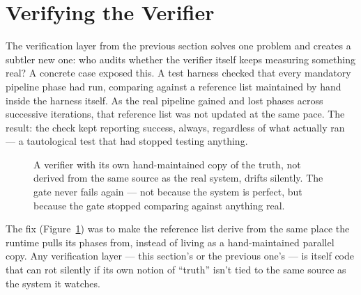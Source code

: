 \documentclass[10pt]{article}
\begin{document}
\section{Verifying the Verifier}

The verification layer from the previous section solves one problem and creates a subtler new one: who audits whether the verifier itself keeps measuring something real? A concrete case exposed this. A test harness checked that every mandatory pipeline phase had run, comparing against a reference list maintained by hand inside the harness itself. As the real pipeline gained and lost phases across successive iterations, that reference list was not updated at the same pace. The result: the check kept reporting success, always, regardless of what actually ran --- a tautological test that had stopped testing anything.

\begin{figure}[h]
\centering
{}
\caption{A verifier with its own hand-maintained copy of the truth, not derived from the same source as the real system, drifts silently. The gate never fails again --- not because the system is perfect, but because the gate stopped comparing against anything real.}
\label{fig:metaverify}
\end{figure}

The fix (Figure~\ref{fig:metaverify}) was to make the reference list derive from the same place the runtime pulls its phases from, instead of living as a hand-maintained parallel copy. Any verification layer --- this section's or the previous one's --- is itself code that can rot silently if its own notion of ``truth'' isn't tied to the same source as the system it watches.
\end{document}
